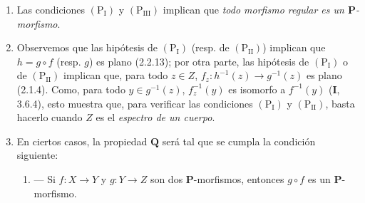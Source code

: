 \begin{remarks}[7.3.5]
\label{IV.2.s7.3.5-fr}
\begin{enumerate}
\item[(i)] Las condiciones $(\mathrm P_{\mathrm I})$ y
$(\mathrm P_{\mathrm{III}})$ implican que \emph{todo morfismo regular
es un $\boldsymbol P$-morfismo}.
\item[(ii)] Observemos que las hipótesis de
$(\mathrm P_{\mathrm I})$ (resp. de $(\mathrm P_{\mathrm{II}})$)
implican que $h=g\circ f$ (resp. $g$) es plano (2.2.13); por otra
parte, las hipótesis de $(\mathrm P_{\mathrm I})$ o de
$(\mathrm P_{\mathrm{II}})$ implican que, para todo $z\in Z$,
$f_z:h^{-1}(z)\to g^{-1}(z)$ es plano (2.1.4). Como, para todo
$y\in g^{-1}(z)$, $f_z^{-1}(y)$ es isomorfo a $f^{-1}(y)$
(\textbf I, 3.6.4), esto muestra que, para verificar las condiciones
$(\mathrm P_{\mathrm I})$ y $(\mathrm P_{\mathrm{II}})$, basta
hacerlo cuando $Z$ es el \emph{espectro de un cuerpo}.
\item[(iii)] En ciertos casos, la propiedad $\boldsymbol Q$
será tal que se cumpla la condición siguiente:
\begin{enumerate}
\item[$(\mathrm P'_{\mathrm I})$.] --- Si $f:X\to Y$ y $g:Y\to Z$
son dos $\boldsymbol P$-morfismos, entonces $g\circ f$ es un
$\boldsymbol P$-morfismo.
\end{enumerate}
\end{enumerate}
\end{remarks}
